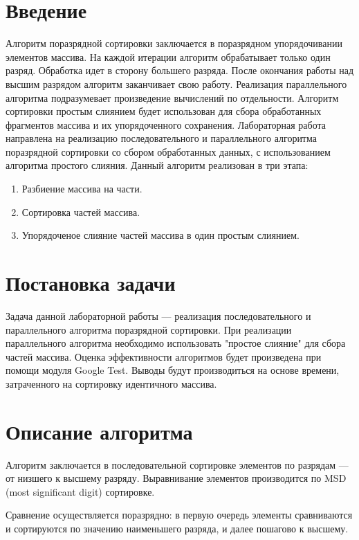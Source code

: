 \documentclass{report}
\begin{document}
\section*{Введение}
\par 
Алгоритм поразрядной сортировки заключается в поразрядном упорядочивании элементов массива. 
На каждой итерации алгоритм обрабатывает только один разряд. Обработка идет в сторону большего разряда. После окончания работы над высшим разрядом алгоритм заканчивает свою работу.
Реализация параллельного алгоритма подразумевает произведение вычислений по отдельности. Алгоритм сортировки простым слиянием будет использован для сбора обработанных фрагментов массива и их упорядоченного сохранения.
Лабораторная работа направлена на реализацию последовательного и параллельного алгоритма поразрядной сортировки со сбором обработанных данных, с использованием алгоритма простого слияния.
Данный алгоритм реализован в три этапа:
\begin{enumerate}
\item Разбиение массива на части.
\item Сортировка частей массива.
\item Упорядоченое слияние частей массива в один простым слиянием.
\end{enumerate}
\newpage
\section*{Постановка задачи}
\par Задача данной лабораторной работы — реализация последовательного и параллельного алгоритма поразрядной сортировки. При реализации параллельного алгоритма необходимо использовать "простое слияние" для сбора частей массива.
Оценка эффективности алгоритмов будет произведена при помощи модуля Google Test. Выводы будут производиться на основе времени, затраченного на сортировку идентичного массива.
\newpage
\section*{Описание алгоритма}
\par Алгоритм заключается в последовательной сортировке элементов по разрядам — от низшего к высшему разряду. Выравнивание элементов производится по MSD (most significant digit) сортировке.

Сравнение осуществляется поразрядно: в первую очередь элементы сравниваются и сортируются по значению наименьшего разряда, и далее пошагово к высшему.
\end{document}
